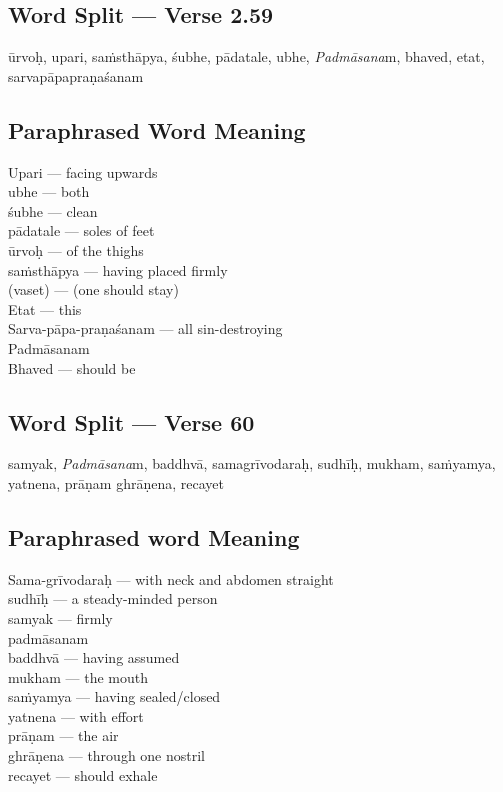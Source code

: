 \subsection*{Word Split --- Verse 2.59}


ūrvoḥ, upari, saṁsthāpya, śubhe, pādatale, ubhe, \textit{Padmāsana}m, bhaved, etat, sarvapāpapraṇaśanam

\subsection*{Paraphrased Word Meaning}


\begin{multicols}{2}
Upari --- facing upwards \\
ubhe --- both \\
śubhe --- clean\\ 
pādatale --- soles of feet \\
ūrvoḥ ---  of the thighs \\
saṁsthāpya --- having placed firmly \\
(vaset) --- (one should stay)\\
Etat --- this \\
Sarva-pāpa-praṇaśanam --- all sin-destroying \\
Padmāsanam \\
Bhaved --- should be
\end{multicols}

\subsection*{Word Split --- Verse 60}


samyak, \textit{Padmāsana}m, baddhvā, samagrīvodaraḥ, sudhīḥ, mukham, saṁyamya, yatnena, prāṇam ghrāṇena, recayet

\subsection*{Paraphrased word Meaning}


\begin{multicols}{2}
Sama-grīvodaraḥ --- with neck and abdomen straight \\
sudhīḥ  --- a steady-minded person \\
samyak --- firmly \\
padmāsanam \\
baddhvā --- having assumed \\
mukham --- the mouth \\
saṁyamya --- having sealed/closed \\
yatnena --- with effort \\
prāṇam --- the air \\
ghrāṇena --- through one nostril \\
recayet --- should exhale 
\end{multicols}

